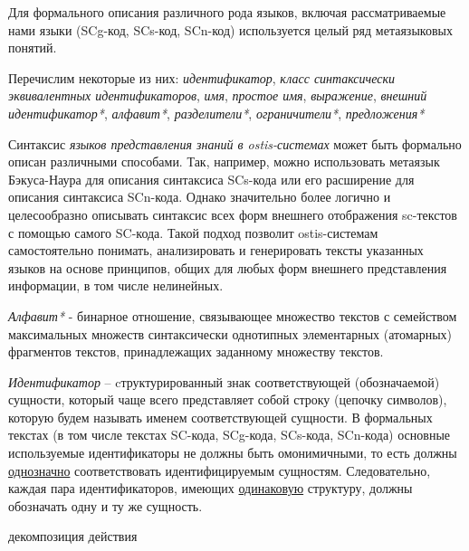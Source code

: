 Для формального описания различного рода языков, включая рассматриваемые нами языки (SCg-код, SCs-код, SCn-код) используется целый ряд метаязыковых понятий.

Перечислим некоторые из них: \textit{идентификатор}, \textit{класс синтаксически эквивалентных идентификаторов}, \textit{имя}, \textit{простое имя}, \textit{выражение}, \textit{внешний идентификатор*}, \textit{алфавит*}, \textit{разделители*}, \textit{ограничители*}, \textit{предложения*}

Синтаксис \textit{языков представления знаний в ostis-системах} может быть формально описан различными способами. Так, например, можно использовать метаязык Бэкуса-Наура для описания синтаксиса SCs-кода или его расширение для описания синтаксиса SCn-кода. Однако значительно более логично и целесообразно описывать синтаксис всех форм внешнего отображения sc-текстов с помощью самого SC-кода. Такой подход позволит ostis-системам самостоятельно понимать, анализировать и генерировать тексты указанных языков на основе принципов, общих для любых форм внешнего представления информации, в том числе нелинейных.

\textit{Алфавит*} - бинарное отношение, связывающее множество текстов с  семейством максимальных множеств синтаксически однотипных элементарных (атомарных) фрагментов текстов, принадлежащих заданному множеству текстов.

\textit{Идентификатор} -- cтруктурированный знак соответствующей (обозначаемой) сущности, который чаще всего представляет собой строку (цепочку символов), которую будем называть именем соответствующей сущности. В формальных текстах (в том числе текстах SC-кода, SCg-кода, SCs-кода, SCn-кода) основные используемые идентификаторы не должны быть омонимичными, то есть должны \underline{однозначно} соответствовать идентифицируемым сущностям. Следовательно, каждая пара идентификаторов, имеющих \underline{одинаковую} структуру, должны обозначать одну и ту же сущность.

\begin{SCn}

    \begin{scnrelfromset}{декомпозиция действия}
        \begin{scnindent}
        \end{scnindent}
        \begin{scnindent}
        \end{scnindent}
    \end{scnrelfromset}

\end{SCn}

